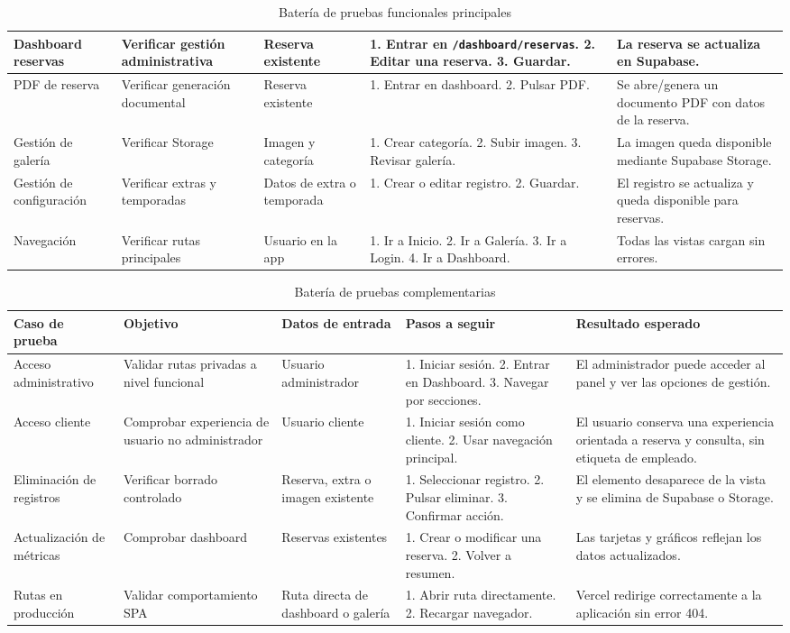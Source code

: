 \documentclass[11pt,a4paper]{article}
\begin{document}
\begin{table}[H]
\begin{tabularx}{\textwidth}{|p{2.8cm}|p{2.7cm}|p{3.2cm}|p{2.9cm}|p{3.1cm}|}
\hline
Dashboard reservas & Verificar gestión administrativa & Reserva existente & 1. Entrar en \texttt{/dashboard/reservas}. 2. Editar una reserva. 3. Guardar. & La reserva se actualiza en Supabase. \\
\hline
PDF de reserva & Verificar generación documental & Reserva existente & 1. Entrar en dashboard. 2. Pulsar PDF. & Se abre/genera un documento PDF con datos de la reserva. \\
\hline
Gestión de galería & Verificar Storage & Imagen y categoría & 1. Crear categoría. 2. Subir imagen. 3. Revisar galería. & La imagen queda disponible mediante Supabase Storage. \\
\hline
Gestión de configuración & Verificar extras y temporadas & Datos de extra o temporada & 1. Crear o editar registro. 2. Guardar. & El registro se actualiza y queda disponible para reservas. \\
\hline
Navegación & Verificar rutas principales & Usuario en la app & 1. Ir a Inicio. 2. Ir a Galería. 3. Ir a Login. 4. Ir a Dashboard. & Todas las vistas cargan sin errores. \\
\hline
\end{tabularx}
\caption{Batería de pruebas funcionales principales}
\end{table}

\begin{table}[H]
\centering
\small
\begin{tabularx}{\textwidth}{|p{2.8cm}|p{2.7cm}|p{3.2cm}|p{2.9cm}|p{3.1cm}|}
\hline
\textbf{Caso de prueba} & \textbf{Objetivo} & \textbf{Datos de entrada} & \textbf{Pasos a seguir} & \textbf{Resultado esperado} \\
\hline
Acceso administrativo & Validar rutas privadas a nivel funcional & Usuario administrador & 1. Iniciar sesión. 2. Entrar en Dashboard. 3. Navegar por secciones. & El administrador puede acceder al panel y ver las opciones de gestión. \\
\hline
Acceso cliente & Comprobar experiencia de usuario no administrador & Usuario cliente & 1. Iniciar sesión como cliente. 2. Usar navegación principal. & El usuario conserva una experiencia orientada a reserva y consulta, sin etiqueta de empleado. \\
\hline
Eliminación de registros & Verificar borrado controlado & Reserva, extra o imagen existente & 1. Seleccionar registro. 2. Pulsar eliminar. 3. Confirmar acción. & El elemento desaparece de la vista y se elimina de Supabase o Storage. \\
\hline
Actualización de métricas & Comprobar dashboard & Reservas existentes & 1. Crear o modificar una reserva. 2. Volver a resumen. & Las tarjetas y gráficos reflejan los datos actualizados. \\
\hline
Rutas en producción & Validar comportamiento SPA & Ruta directa de dashboard o galería & 1. Abrir ruta directamente. 2. Recargar navegador. & Vercel redirige correctamente a la aplicación sin error 404. \\
\hline
\end{tabularx}
\caption{Batería de pruebas complementarias}
\end{table}
\end{document}
